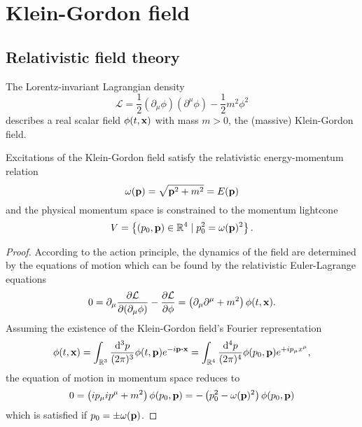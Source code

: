 \section{Klein-Gordon field}

\subsection{Relativistic field theory}

\begin{definition}
	The Lorentz-invariant Lagrangian density
	\begin{equation}
		\mathcal{L}
		=
		\frac{1}{2}
		\left(\partial_\mu\phi\right)
		\left(\partial^\mu\phi\right)
		-
		\frac{1}{2}
		m^2\phi^2
		\label{eq:kg_lagrangian}
	\end{equation}
	describes a real scalar field $\phi(t,\vb{x})$ with mass $m>0$, the (massive) Klein-Gordon field.
\end{definition}
\begin{theorem}\label{th:relativistic_energy_momentum}
	Excitations of the Klein-Gordon field satisfy the relativistic energy-momentum relation
	\begin{equation}
		\omega(\vb{p})
		=
		\sqrt{\vb{p}^2+m^2}
		=
		E(\vb{p})
		\label{eq:energy_momentum_relation}
	\end{equation}
	and the physical momentum space is constrained to the momentum lightcone
	\begin{equation}
		V
		=
		\left\{
			(p_0,\vb{p})\in\mathbb{R}^4
			\mid
			p_0^2=\omega(\vb{p})^2
		\right\}
		\label{eq:momentum_lightcone}
		.
	\end{equation}
\end{theorem}
\begin{proof}
	According to the action principle, the dynamics of the field are determined by the equations of motion which can be found by the relativistic Euler-Lagrange equations
	\begin{equation*}
		0
		=
		\partial_\mu\pdv{\mathcal{L}}{(\partial_\mu\phi)}
		-
		\pdv{\mathcal{L}}{\phi}
		=
		\left(
			\partial_\mu\partial^\mu
			+
			m^2
		\right)
		\phi(t,\vb{x})
		.
	\end{equation*}
	Assuming the existence of the Klein-Gordon field's Fourier representation~\cite[p.~341]{Cohen2019}
	\begin{equation}
		\phi(t,\vb{x})
		=
		\int_{\mathbb{R}^3}\frac{\dd[3]{p}}{(2\pi)^3}
		\phi(t,\vb{p})
		e^{-i\vb{p}\vdot\vb{x}}
		=
		\int_{\mathbb{R}^4}\frac{\dd[4]{p}}{(2\pi)^4}
		\phi(p_0,\vb{p})
		e^{+ip_\mu x^\mu}
		,
	\end{equation}
	the equation of motion in momentum space reduces to
	\begin{equation}
		0
		=
		\left(
			ip_\mu ip^\mu
			+
			m^2
		\right)
		\phi(p_0,\vb{p})
		=
		-
		\left(
			p_0^2
			-
			\omega(\vb{p})^2
		\right)
		\phi(p_0,\vb{p})
	\end{equation}
	which is satisfied if $p_0=\pm\omega(\vb{p})$.
\end{proof}

